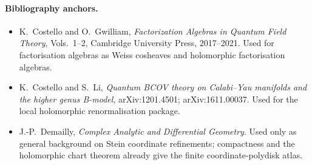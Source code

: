 \paragraph{Bibliography anchors.}
\begin{itemize}
\item K.~Costello and O.~Gwilliam,
\emph{Factorization Algebras in Quantum Field Theory}, Vols.~1--2,
Cambridge University Press, 2017--2021. Used for factorisation
algebras as Weiss cosheaves and holomorphic factorisation algebras.
\item K.~Costello and S.~Li,
\emph{Quantum BCOV theory on Calabi--Yau manifolds and the higher genus
B-model}, arXiv:1201.4501; arXiv:1611.00037. Used for the local
holomorphic renormalisation package.
\item J.-P.~Demailly,
\emph{Complex Analytic and Differential Geometry}. Used only as general
background on Stein coordinate refinements; compactness and the
holomorphic chart theorem already give the finite coordinate-polydisk
atlas.
\end{itemize}
